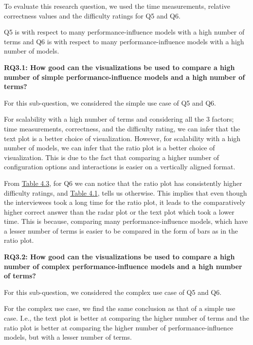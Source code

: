 To evaluate this research question, we used the time measurements, relative correctness values and the difficulty ratings for Q5 and Q6.

Q5 is with respect to many performance-influence models with a high number of terms and Q6 is with respect to many performance-influence models with a high number of models.

\begin{mdframed} 
\textbf{RQ3.1: How good can the visualizations be used to compare a high number of simple performance-influence models and a high number of terms?}
\end{mdframed}

For this sub-question, we considered the simple use case of Q5 and Q6.

For scalability with a high number of terms and considering all the 3 factors; time measurements, correctness, and the difficulty rating, we can infer that the text plot is a better choice of visualization. However, for scalability with a high number of models, we can infer that the ratio plot is a better choice of visualization. This is due to the fact that comparing a higher number of configuration options and interactions is easier on a vertically aligned format.

From \hyperref[table:rating]{Table 4.3}, for Q6 we can notice that the ratio plot has consistently higher difficulty ratings, and  \hyperref[table:correctness]{Table 4.1}, tells us otherwise. This implies that even though the interviewees took a long time for the ratio plot, it leads to the comparatively higher correct answer than the radar plot or the text plot which took a lower time. This is because, comparing many performance-influence models, which have a lesser number of terms is easier to be compared in the form of bars as in the ratio plot.


\begin{mdframed} 
\textbf{RQ3.2: How good can the visualizations be used to compare a high number of complex performance-influence models and a high number of terms?}
\end{mdframed}

For this sub-question, we considered the complex use case of Q5 and Q6.

For the complex use case, we find the same conclusion as that of a simple use case. I.e., the text plot is better at comparing the higher number of terms and the ratio plot is better at comparing the higher number of performance-influence models, but with a lesser number of terms. 

